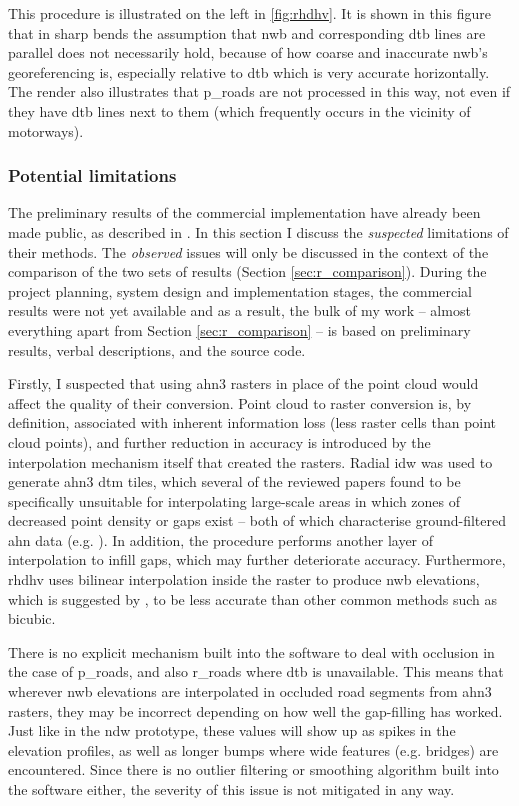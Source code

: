 This procedure is illustrated on the left in \ref{fig:rhdhv}. It is shown in this figure that in sharp bends the assumption that \ac{nwb} and corresponding \ac{dtb} lines are parallel does not necessarily hold, because of how coarse and inaccurate \ac{nwb}'s georeferencing is, especially relative to \ac{dtb} which is very accurate horizontally. The render also illustrates that \ac{p_roads} are not processed in this way, not even if they have \ac{dtb} lines next to them (which frequently occurs in the vicinity of motorways).

\subsubsection{Potential limitations}

The preliminary results of the commercial implementation have already been made public, as described in \cite{nwb_hoogte}. In this section I discuss the \textit{suspected} limitations of their methods. The \textit{observed} issues will only be discussed in the context of the comparison of the two sets of results (Section \ref{sec:r_comparison}). During the project planning, system design and implementation stages, the commercial results were not yet available and as a result, the bulk of my work – almost everything apart from Section \ref{sec:r_comparison} – is based on preliminary results, verbal descriptions, and the source code.

Firstly, I suspected that using \ac{ahn3} rasters in place of the point cloud would affect the quality of their conversion. Point cloud to raster conversion is, by definition, associated with inherent information loss (less raster cells than point cloud points), and further reduction in accuracy is introduced by the interpolation mechanism itself that created the rasters. Radial \ac{idw} was used to generate \ac{ahn3} \ac{dtm} tiles, which several of the reviewed papers found to be specifically unsuitable for interpolating large-scale areas in which zones of decreased point density or gaps exist – both of which characterise ground-filtered \ac{ahn} data (e.g. \cite{guo_etal_2010}). In addition, the procedure performs another layer of interpolation to infill gaps, which may further deteriorate accuracy. Furthermore, \ac{rhdhv} uses bilinear interpolation inside the raster to produce \ac{nwb} elevations, which is suggested by \cite{shi_etal_2005}, to be less accurate than other common methods such as bicubic.

There is no explicit mechanism built into the software to deal with occlusion in the case of \ac{p_roads}, and also \ac{r_roads} where \ac{dtb} is unavailable. This means that wherever \ac{nwb} elevations are interpolated in occluded road segments from \ac{ahn3} rasters, they may be incorrect depending on how well the gap-filling has worked. Just like in the \ac{ndw} prototype, these values will show up as spikes in the elevation profiles, as well as longer bumps where wide features (e.g. bridges) are encountered. Since there is no outlier filtering or smoothing algorithm built into the software either, the severity of this issue is not mitigated in any way.


